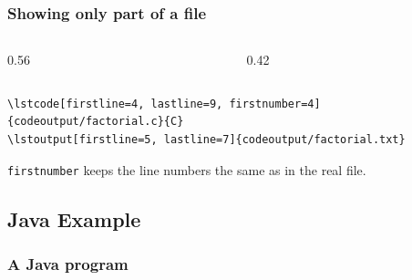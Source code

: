 \documentclass[aspectratio=169,10pt,compress]{beamer}
\begin{document}
\begin{frame}[t,fragile] \frametitle{Showing only part of a file}
  \begin{columns}[T]
    \begin{column}{0.56\textwidth}
    \end{column}
    \begin{column}{0.42\textwidth}
    \end{column}
  \end{columns}

  \vspace{0.5em}


\begin{lstlisting}[language={[LaTeX]TeX}, basicstyle=\ttfamily\scriptsize, frame=single,
                   backgroundcolor=\color{codebg}, rulecolor=\color{gray!40}]
\lstcode[firstline=4, lastline=9, firstnumber=4]{codeoutput/factorial.c}{C}
\lstoutput[firstline=5, lastline=7]{codeoutput/factorial.txt}
\end{lstlisting}


  \small \texttt{firstnumber} keeps the line numbers the same as in the real file.
\end{frame}










\subsection[Java]{Java Example}

\begin{frame}[t,fragile] \frametitle{A Java program}
\end{frame}
\end{document}
